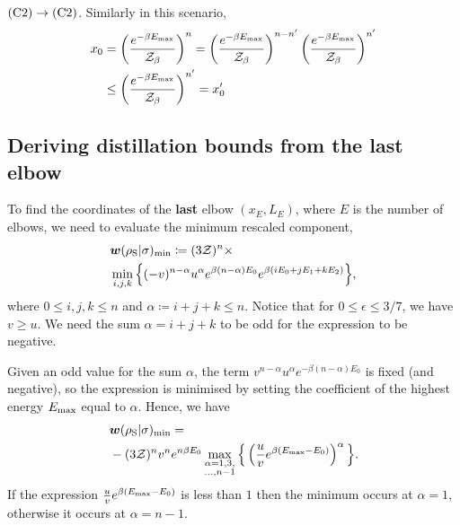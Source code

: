 \documentclass[pra,
aps,
twocolumn,
superscriptaddress,
groupedaddress,
nofootinbib,
reprint
]{revtex4-1}
\begin{document}
$\rm{(C2)} \rightarrow \rm{(C2)}$.
Similarly in this scenario,
	\begin{align*}
		x_0 &= \left(\dfrac{e^{-\beta E_{\rm{max}}}}{\mathcal{Z}_\beta}\right)^n = \left(\dfrac{e^{-\beta E_{\rm{max}}}}{\mathcal{Z}_\beta}\right)^{n-n'} \left(\dfrac{e^{-\beta E_{\rm{max}}}}{\mathcal{Z}_\beta}\right)^{n'} \\
		&\leq \left(\dfrac{e^{-\beta E_{\rm{max}}}}{\mathcal{Z}_\beta}\right)^{n'} = x_0'	
	\end{align*}
	
\subsection{Deriving distillation bounds from the last elbow}
\label{sec:last_elb}


To find the coordinates of the \textbf{last} elbow $(x_E, L_E)$, where $E$ is the number of elbows, we need to evaluate the minimum rescaled component,
\begin{align}
	&\bm{w}(\rho_{\rm{S}} | \sigma)_{\rm{min}} \coloneqq (3\mathcal{Z})^{n}\times \nonumber\\
	&\min\limits_{i,j,k}\Big\{ (-v)^{n-\alpha} u^{\alpha} e^{\beta (n-\alpha)E_0} e^{\beta ( i E_0 + j E_1 + k E_2 )} \Big\}, \label{eq:min_slope}
\end{align}
where $0 \leq i,j,k \leq n$ and $\alpha \coloneqq i+j+k \leq n$.
Notice that for $0 \leq \epsilon \leq 3/7$, we have $v \geq u$. 
We need the sum $\alpha = i+j+k$ to be odd for the expression to be negative.

Given an odd value for the sum $\alpha$, the term $v^{n-\alpha} u^{\alpha} e^{-\beta (n-\alpha)E_0}$ is fixed (and negative), so the expression is minimised by setting the coefficient of the highest energy $E_{\rm{max}}$ equal to $\alpha$.
Hence, we have
\begin{align}
	&\bm{w}(\rho_{\rm{S}} | \sigma)_{\rm{min}} = \nonumber\\
	&-(3\mathcal{Z})^{n} v^n e^{n\beta E_0}\max\limits_{\substack{\alpha = 1,3, \\ \dots,n-1}}{\Big\{ \left( \frac{u}{v} e^{\beta (E_{\rm{max}} - E_0)} \right)^{\alpha} \Big\}}.
\end{align}
If the expression $\frac{u}{v} e^{\beta (E_{\rm{max}} - E_0)}$ is less than $1$ then the minimum occurs at $\alpha=1$, otherwise it occurs at $\alpha = n-1$.
\end{document}
